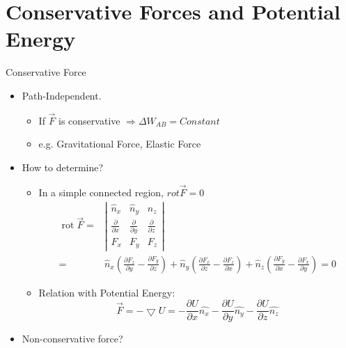 \documentclass{beamer}
\begin{document}
\section{Conservative Forces and Potential Energy}
\begin{frame}{Conservative Force}
  \begin{itemize}
    \item Path-Independent.
    \begin{itemize}
      \item If $\vec{F}$ is conservative $\Rightarrow \Delta W_{AB} = Constant$\pause
      \item e.g. Gravitational Force, Elastic Force 
    \end{itemize}\pause
    \item How to determine?
    \begin{itemize}
      \item In a simple connected region, $rot\vec{F} = 0$ $$\begin{aligned}
        \operatorname{rot} \vec{F}=&\left|\begin{array}{ccc}
        \hat{n}_{x} & \hat{n}_{y} & \hat{n}_{z} \\
        \frac{\partial}{\partial x} & \frac{\partial}{\partial y} & \frac{\partial}{\partial z} \\
        F_{x} & F_{y} & F_{z}
        \end{array}\right|\\=&  \hat{n}_{x}\left(\frac{\partial F_{z}}{\partial y}-\frac{\partial F_{y}}{\partial z}\right)+\hat{n}_{y}\left(\frac{\partial F_{x}}{\partial z}-\frac{\partial F_{z}}{\partial x}\right)+\hat{n}_{z}\left(\frac{\partial F_{y}}{\partial x}-\frac{\partial F_{x}}{\partial y}\right)=0
        \end{aligned}$$\pause
        \item Relation with Potential Energy:$$\vec{F}=-\bigtriangledown U=-\frac{\partial U}{\partial x}\hat{n_x}-\frac{\partial U}{\partial y}\hat{n_y}-\frac{\partial U}{\partial z}\hat{n_z}$$
    \end{itemize}\pause
    \item Non-conservative force?
  \end{itemize}
\end{frame}
\end{document}
